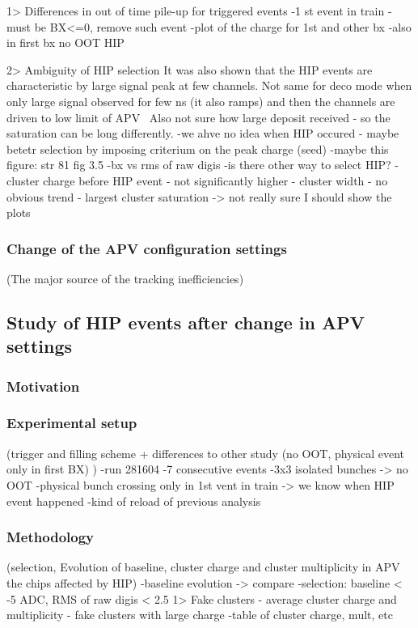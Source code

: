          1> Differences in out of time pile-up for triggered events
-1 st event in train - must be BX<=0, remove such event
-plot of the charge for 1st and other bx
-also in first bx no OOT HIP

         2> Ambiguity of HIP selection
It was also shown that the HIP events are characteristic by large signal peak at few channels. Not same for deco mode when only large signal observed for few ns (it also ramps) and then the channels are driven to low limit of APV~\cite{Bainbridge:2002bda} Also not sure how large deposit received - so the saturation can be long differently.
-we ahve no idea when HIP occured - maybe betetr selection by imposing criterium on the peak charge (seed)
-maybe this figure: str 81 fig 3.5
-bx vs rms of raw digis
-is there other way to select HIP?
	- cluster charge before HIP event - not significantly higher
	- cluster width - no obvious trend
	- largest cluster saturation
        -> not really sure I should show the plots

\subsubsection{Change of the APV configuration settings}
          (The major source of the tracking inefficiencies)
\subsection{Study of HIP events after change in APV settings}

\subsubsection{Motivation}

\subsubsection{Experimental setup}
        (trigger and filling scheme + differences to other study (no OOT, physical event only in first BX) )
-run 281604
-7 consecutive events
-3x3 isolated bunches -> no OOT
-physical bunch crossing only in 1st vent in train
-> we know when HIP event happened
-kind of reload of previous analysis
\subsubsection{Methodology}
        (selection, Evolution of baseline, cluster charge and cluster multiplicity in APV the chips affected by HIP)
-baseline evolution -> compare
-selection: baseline < -5 ADC, RMS of raw digis < 2.5
         1> Fake clusters
- average cluster charge and multiplicity - fake clusters with large charge
-table of cluster charge, mult, etc
